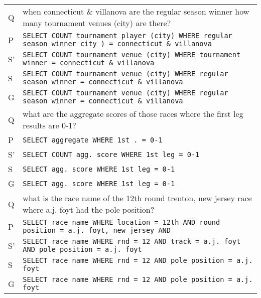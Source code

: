 \begin{table}[ht]
\scriptsize
\centering
\begin{tabular}{ll}
\toprule
Q       & when connecticut \& villanova are the regular season winner how many tournament venues (city) are there?       \\
P   & \texttt{SELECT COUNT tournament player (city) WHERE regular season winner city ) = connecticut \& villanova} \\
S' & \texttt{SELECT COUNT tournament venue (city) WHERE tournament winner = connecticut \& villanova}             \\
S         & \texttt{SELECT COUNT tournament venue (city) WHERE regular season winner = connecticut \& villanova}         \\
G   & \texttt{SELECT COUNT tournament venue (city) WHERE regular season winner = connecticut \& villanova}         \\
\midrule
Q       & what are the aggregate scores of those races where the first leg results are 0-1?                              \\
P   & \texttt{SELECT aggregate WHERE 1st . = 0-1}                                                                  \\
S' & \texttt{SELECT COUNT agg. score WHERE 1st leg = 0-1}                                                         \\
S         & \texttt{SELECT agg. score WHERE 1st leg = 0-1}                                                               \\
G   & \texttt{SELECT agg. score WHERE 1st leg = 0-1}                                                               \\
\midrule
Q       & what is the race name of the 12th round trenton, new jersey race where a.j. foyt had the pole position?        \\
P   & \texttt{SELECT race name WHERE location = 12th AND round position = a.j. foyt, new jersey AND}               \\
S' & \texttt{SELECT race name WHERE rnd = 12 AND track = a.j. foyt AND pole position = a.j. foyt}                 \\
S         & \texttt{SELECT race name WHERE rnd = 12 AND pole position = a.j. foyt}                                       \\
G   & \texttt{SELECT race name WHERE rnd = 12 AND pole position = a.j. foyt}                                       \\

\end{tabular}
\end{table}
